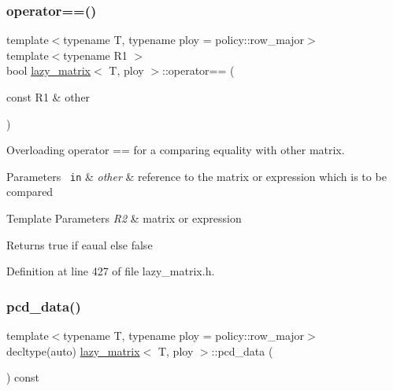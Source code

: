 \subsubsection{\texorpdfstring{operator==()}{operator==()}}
{\footnotesize\ttfamily template$<$typename T, typename ploy = policy\+::row\+\_\+major$>$ \\
template$<$typename R1 $>$ \\
bool \mbox{\hyperlink{classlazy__matrix}{lazy\+\_\+matrix}}$<$ T, ploy $>$\+::operator== (\begin{DoxyParamCaption}\item[{const R1 \&}]{other }\end{DoxyParamCaption})\hspace{0.3cm}{\ttfamily [inline]}}



Overloading operator == for a comparing equality with other matrix. 


\begin{DoxyParams}[1]{Parameters}
\mbox{\texttt{ in}}  & {\em other} & reference to the matrix or expression which is to be compared\\
\hline
\end{DoxyParams}

\begin{DoxyTemplParams}{Template Parameters}
{\em R2} & matrix or expression\\
\hline
\end{DoxyTemplParams}
\begin{DoxyReturn}{Returns}
true if eaual else false 
\end{DoxyReturn}


Definition at line 427 of file lazy\+\_\+matrix.\+h.

\mbox{\label{classlazy__matrix_af88477b2ff394bf5b61b554f3017bf89}} 
\subsubsection{\texorpdfstring{pcd\_data()}{pcd\_data()}}
{\footnotesize\ttfamily template$<$typename T, typename ploy = policy\+::row\+\_\+major$>$ \\
decltype(auto) \mbox{\hyperlink{classlazy__matrix}{lazy\+\_\+matrix}}$<$ T, ploy $>$\+::pcd\+\_\+data (\begin{DoxyParamCaption}{ }\end{DoxyParamCaption}) const\hspace{0.3cm}{\ttfamily [inline]}}



